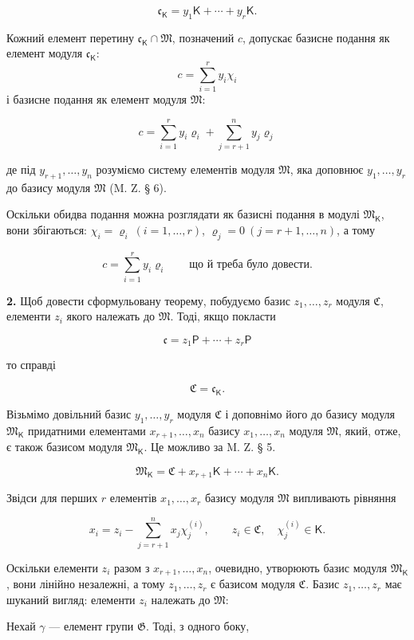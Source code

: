 \documentclass[11pt]{article}
\begin{document}
\[
\mathfrak c_{\mathsf K}=y_1\mathsf K+\cdots+y_r\mathsf K.
\]

Кожний елемент перетину \(\mathfrak c_{\mathsf K}\cap\mathfrak M\), позначений \(c\), допускає базисне подання як елемент модуля \(\mathfrak c_{\mathsf K}\):
\[
c=\sum_{i=1}^{r}y_i\chi_i
\]
і базисне подання як елемент модуля \(\mathfrak M\):

\[
c=\sum_{i=1}^{r}y_i\varrho_i+\sum_{j=r+1}^{n}y_j\varrho_j
\]

де під \(y_{r+1},\ldots,y_n\) розуміємо систему елементів модуля \(\mathfrak M\), яка доповнює \(y_1,\ldots,y_r\) до базису модуля \(\mathfrak M\) (M. Z. § 6).

Оскільки обидва подання можна розглядати як базисні подання в модулі \(\mathfrak M_{\mathsf K}\), вони збігаються: \(\chi_i=\varrho_i\ (i=1,\ldots,r)\), \(\varrho_j=0\ (j=r+1,\ldots,n)\), а тому

\[
c=\sum_{i=1}^{r}y_i\varrho_i
\qquad\text{що й треба було довести.}
\]

\textbf{2.} Щоб довести сформульовану теорему, побудуємо базис \(z_1,\ldots,z_r\) модуля \(\mathfrak C\), елементи \(z_i\) якого належать до \(\mathfrak M\). Тоді, якщо покласти

\[
\mathfrak c=z_1\mathsf P+\cdots+z_r\mathsf P
\]

то справді

\[
\mathfrak C=\mathfrak c_{\mathsf K}.
\]

Візьмімо довільний базис \(y_1,\ldots,y_r\) модуля \(\mathfrak C\) і доповнімо його до базису модуля \(\mathfrak M_{\mathsf K}\) придатними елементами \(x_{r+1},\ldots,x_n\) базису \(x_1,\ldots,x_n\) модуля \(\mathfrak M\), який, отже, є також базисом модуля \(\mathfrak M_{\mathsf K}\). Це можливо за M. Z. § 5.

\[
\mathfrak M_{\mathsf K}=\mathfrak C+x_{r+1}\mathsf K+\cdots+x_n\mathsf K.
\]

Звідси для перших \(r\) елементів \(x_1,\ldots,x_r\) базису модуля \(\mathfrak M\) випливають рівняння

\[
x_i=z_i-\sum_{j=r+1}^{n}x_j\chi_j^{(i)},\qquad
z_i\in\mathfrak C,\quad \chi_j^{(i)}\in\mathsf K.
\]

Оскільки елементи \(z_i\) разом з \(x_{r+1},\ldots,x_n\), очевидно, утворюють базис модуля \(\mathfrak M_{\mathsf K}\), вони лінійно незалежні, а тому \(z_1,\ldots,z_r\) є базисом модуля \(\mathfrak C\). Базис \(z_1,\ldots,z_r\) має шуканий вигляд: елементи \(z_i\) належать до \(\mathfrak M\):

Нехай \(\gamma\) --- елемент групи \(\mathfrak G\). Тоді, з одного боку,
\end{document}
